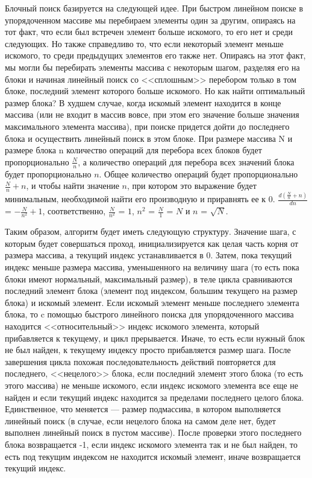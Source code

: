 \documentclass[12pt]{article}
\begin{document}
{	Блочный поиск базируется на следующей идее. При быстром линейном поиске в упорядоченном массиве мы перебираем элементы один за другим, опираясь на тот факт, что если был встречен элемент больше искомого, то его нет и среди следующих. Но также справедливо то, что если некоторый элемент меньше искомого, то среди предыдущих элементов его также нет. Опираясь на этот факт, мы могли бы перебирать элементы массива с некоторым шагом, разделяя его на блоки и начиная линейный поиск со <<сплошным>> перебором только в том блоке, последний элемент которого больше искомого. Но как найти оптимальный размер блока? В худшем случае, когда искомый элемент находится в конце массива (или не входит в массив вовсе, при этом его значение больше значения максимального элемента массива), при поиске придется дойти до последнего блока и осуществить линейный поиск в этом блоке. При размере массива N и размере блока n количество операций для перебора всех блоков будет пропорционально $\frac{N}{n}$, а количество операций для перебора всех значений блока будет пропорционально $n$. Общее количество операций будет пропорционально $\frac{N}{n} + n$, и чтобы найти значение $n$, при котором это выражение будет минимальным, необходимой найти его производную и приравнять ее к 0. $\frac{d(\frac{N}{n} + n)}{dn}$ = $-\frac{N}{n^2} + 1$, соответственно, $\frac{N}{n^2}$ = $1$, $n^2$ = $\frac{N}{1}$ = $N$ и $n$ = $\sqrt{N}$.
	
	Таким образом, алгоритм будет иметь следующую структуру. Значение шага, с которым будет совершаться проход, инициализируется как целая часть корня от размера массива, а текущий индекс устанавливается в 0. Затем, пока текущий индекс меньше размера массива, уменьшенного на величину шага (то есть пока блоки имеют нормальный, максимальный размер), в теле цикла сравниваются последний элемент блока (элемент под индексом, большим текущего на размер блока) и искомый элемент. Если искомый элемент меньше последнего элемента блока, то c помощью быстрого линейного поиска для упорядоченного массива находится <<относительный>> индекс искомого элемента, который прибавляется к текущему, и цикл прерывается. Иначе, то есть если нужный блок не был найден, к текущему индексу просто прибавляется размер шага. После завершения цикла похожая последовательность действий повторяется для последнего, <<нецелого>> блока, если последний элемент этого блока (то есть этого массива) не меньше искомого, если индекс искомого элемента все еще не найден и если текущий индекс находится за пределами последнего целого блока. Единственное, что меняется --- размер подмассива, в котором выполняется линейный поиск (в случае, если нецелого блока на самом деле нет, будет выполнен линейный поиск в пустом массиве). После проверки этого последнего блока возвращается -1, если индекс искомого элемента так и не был найден, то есть под текущим индексом не находится искомый элемент, иначе возвращается текущий индекс.
	
}
\end{document}

